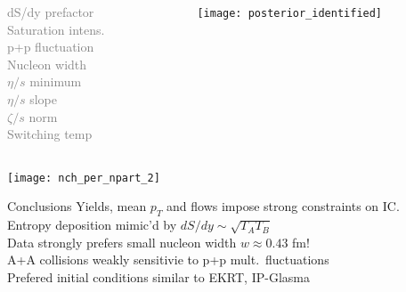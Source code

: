 \documentclass[xcolor=dvipsnames]{beamer}
\begin{document}
\begin{frame}
    \begin{columns}
        \begin{column}{0.2\textwidth}
            \vspace{-0.8 cm}
            \flushright \scriptsize
            \textcolor{gray}{dS/dy prefactor} \\
            \vspace{0.67 cm}
            \textcolor{gray}{Saturation intens.} \\
            \vspace{0.67 cm}
            \textcolor{gray}{p+p fluctuation} \\
            \vspace{0.67 cm}
            \textcolor{gray}{Nucleon width} \\
            \vspace{0.67 cm}
            \textcolor{gray}{$\eta/s$ minimum} \\
            \vspace{0.67 cm}
            \textcolor{gray}{$\eta/s$ slope} \\
            \vspace{0.67 cm}
            \textcolor{gray}{$\zeta/s$ norm} \\
            \vspace{0.67 cm}
            \textcolor{gray}{Switching temp}
        \end{column}
        \begin{column}{0.8\textwidth}
            \texttt{[image: posterior\_identified]}
        \end{column}
    \end{columns}
\end{frame}

\begin{frame}
    \texttt{[image: nch\_per\_npart\_2]}
\end{frame}

\begin{frame}{Conclusions}
Yields, mean $p_T$ and flows impose strong constraints on IC. \\
Entropy  deposition mimic'd by $dS/dy \sim \sqrt{T_A T_B}$ \\
Data strongly prefers small nucleon width $w \approx 0.43$ fm! \\
A+A collisions weakly sensitivie to p+p mult.\ fluctuations \\
Prefered initial conditions similar to EKRT, IP-Glasma \\


\end{frame}
\end{document}
